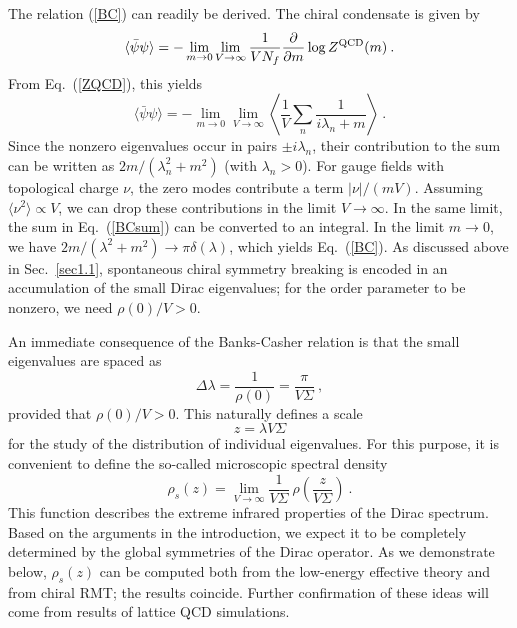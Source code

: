 The relation (\ref{BC}) can readily be derived.  The chiral condensate
is given by
\begin{equation}
  \label{massder}
  \langle\bar\psi\psi\rangle=-\lim_{m\to0}\lim_{V\to\infty}
  \frac{1}{VN_f}\frac{\partial}{\partial m}\log Z^{\rm QCD}(m)\:.
\end{equation}
{}From Eq.~(\ref{ZQCD}), this yields
\begin{equation}
  \label{BCsum}
  \langle\bar\psi\psi\rangle=-\lim_{m\to0}\lim_{V\to\infty}
  \left\langle\frac{1}{V}\sum_n\frac{1}{i\lambda_n+m}\right\rangle\:.
\end{equation}
Since the nonzero eigenvalues occur in pairs $\pm i\lambda_n$, their
contribution to the sum can be written as $2m/(\lambda_n^2+m^2)$ (with
$\lambda_n>0$).  For gauge fields with topological charge $\nu$, the
zero modes contribute a term $|\nu|/(mV)$.  Assuming
$\langle\nu^2\rangle\propto V$, we can drop these contributions in the
limit $V\to\infty$.  In the same limit, the sum in Eq.~(\ref{BCsum})
can be converted to an integral.  In the limit $m\to0$, we have
$2m/(\lambda^2+m^2)\to\pi\delta(\lambda)$, which yields Eq.~(\ref{BC}).
As discussed above in Sec.~\ref{sec1.1}, spontaneous chiral symmetry
breaking is encoded in an accumulation of the small Dirac eigenvalues;
for the order parameter to be nonzero, we need $\rho(0)/V>0$.

An immediate consequence of the Banks-Casher relation is that the
small eigenvalues are spaced as
\begin{equation}
  \label{spacing}
  \Delta\lambda=\frac{1}{\rho(0)}=\frac{\pi}{V\Sigma}\:,
\end{equation}
provided that $\rho(0)/V>0$.  This naturally defines a scale
\begin{equation}
  \label{scale}
  z=\lambda V\Sigma
\end{equation}
for the study of the distribution of individual eigenvalues.  For this
purpose, it is convenient to define the so-called microscopic spectral
density \cite{Shur93}
\begin{equation}
  \label{micro}
  \rho_s(z)=\lim_{V\to\infty}\frac{1}{V\Sigma}\:
  \rho\left(\frac{z}{V\Sigma}\right)\:.
\end{equation}
This function describes the extreme infrared properties of the Dirac
spectrum.  Based on the arguments in the introduction, we expect it to
be completely determined by the global symmetries of the Dirac
operator.  As we demonstrate below, $\rho_s(z)$ can be computed both from
the low-energy effective theory and from chiral RMT;
the results coincide.  Further confirmation of these ideas
will come from results of lattice QCD simulations.



